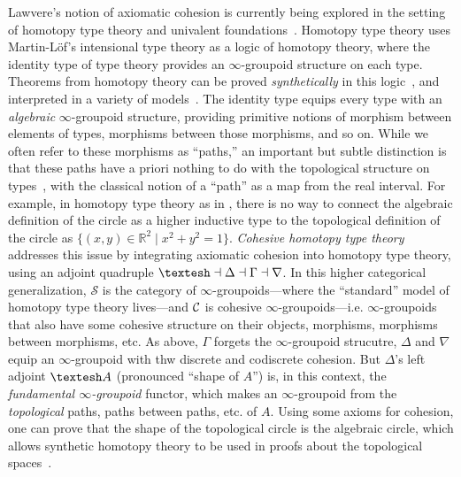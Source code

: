 \documentclass{drl-common/llncs}
\begin{document}
Lawvere's notion of axiomatic cohesion is currently being explored in
the setting of homotopy type theory and univalent
foundations~\citep{voevodsky06note,uf13hott-book}.  Homotopy type theory
uses Martin-L\"of's intensional type theory as a logic of homotopy
theory, where the identity type of type theory provides an
$\infty$-groupoid structure on each type.  Theorems from homotopy theory
can be proved \emph{synthetically} in this
logic~\citep{ls13pi1s1,lb13pinsn,...}, and interpreted in a variety of
models~\citep{...}.  The identity type equips every type with an
\emph{algebraic} $\infty$-groupoid structure, providing primitive
notions of morphism between elements of types, morphisms between those
morphisms, and so on.  While we often refer to these morphisms as
``paths,'' an important but subtle distinction is that these paths have
a priori nothing to do with the topological structure on
types~\citep{scott,etc}, with the classical notion of a ``path'' as a
map from the real interval.  For example, in homotopy type theory as in
\citep{uf13hott-book}, there is no way to connect the algebraic
definition of the circle as a higher inductive type to the topological
definition of the circle as $\{ (x,y) \in \mathbb{R}^2 \mid x^2 + y^2 =
1\}$.  \emph{Cohesive homotopy type theory}~\citep{ss12,shulman15}
addresses this issue by integrating axiomatic cohesion into homotopy
type theory, using an adjoint quadruple $\sh \la \Delta \la \Gamma \la
\nabla$.  In this higher categorical generalization, $\mathcal{S}$ is
the category of $\infty$-groupoids---where the ``standard'' model of
homotopy type theory lives---and $\mathcal{C}$ is cohesive
$\infty$-groupoids---i.e. $\infty$-groupoids that also have some
cohesive structure on their objects, morphisms, morphisms between
morphisms, etc.  As above, $\Gamma$ forgets the $\infty$-groupoid
strucutre, $\Delta$ and $\nabla$ equip an $\infty$-groupoid with thw
discrete and codiscrete cohesion.  But $\Delta$'s left adjoint $\sh A$
(pronounced ``shape of $A$'') is, in this context, the \emph{fundamental
  $\infty$-groupoid} functor, which makes an $\infty$-groupoid from the
\emph{topological} paths, paths between paths, etc. of $A$.  Using some
axioms for cohesion, one can prove that the shape of the topological
circle is the algebraic circle, which allows synthetic homotopy theory
to be used in proofs about the topological spaces~\citep{s15}.  




{ %


}
\end{document}
